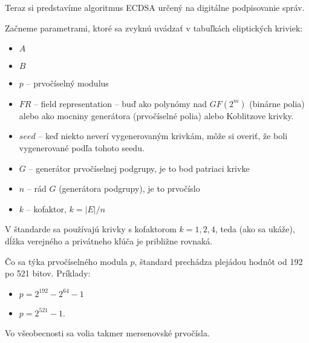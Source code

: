 Teraz si predstavíme algoritmus ECDSA určený na digitálne podpisovanie
správ.

Začneme parametrami, ktoré sa zvyknú uvádzať v tabuľkách eliptických
kriviek:
\begin{itemize}
    \item $A$
    \item $B$
    \item $p$ -- prvočíselný modulus
    \item $FR$ -- field representation -- buď ako polynómy nad
        $GF(2^m)$ (binárne polia)
        alebo ako mocniny generátora (prvočíselné polia)
        alebo Koblitzove krivky.
    \item $seed$ -- keď niekto neverí vygenerovaným krivkám, môže si
        overiť, že boli vygenerované podľa tohoto seedu.
    \item $G$ -- generátor prvočíselnej podgrupy, je to bod patriaci krivke
    \item $n$ -- rád $G$ (generátora podgrupy), je to prvočíslo
    \item $k$ -- kofaktor, $k=|E| / n$
\end{itemize}
\begin{poznamka}
    V štandarde sa používajú krivky s kofaktorom $k=1,2,4$, teda (ako
    sa ukáže), dĺžka verejného a privátneho kľúča je približne
    rovnaká.
\end{poznamka}

Čo sa týka prvočíselného modula $p$, štandard prechádza plejádou
hodnôt od 192 po 521 bitov.
Príklady:
\begin{itemize}
    \item $p=2^{192} - 2^{64} - 1$ 
    \item $p=2^{521} - 1$.
\end{itemize}
Vo všeobecnosti sa volia takmer mersenovské prvočísla.

